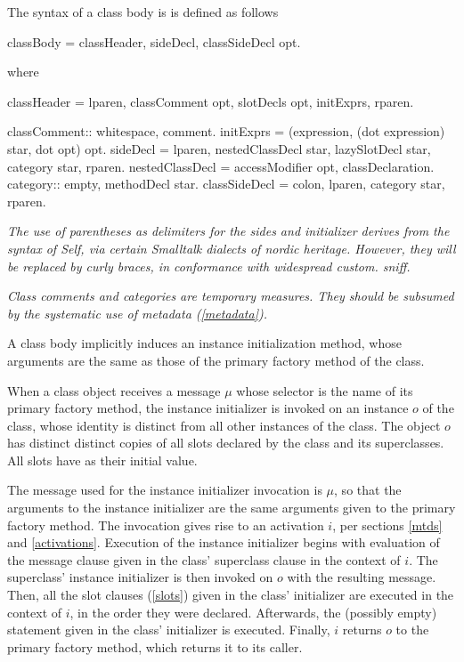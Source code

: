 \documentclass{article}
\begin{document}
The syntax of a class body is is defined as follows


\begin{newspeak}
classBody = classHeader, sideDecl, classSideDecl opt.
\end{newspeak}
where

\begin{newspeak}
classHeader =  lparen,  classComment opt, 
                        slotDecls opt, initExprs,  rparen.   

                                             
classComment:: whitespace, comment.     
initExprs = (expression, (dot expression) star, dot opt) opt.  
sideDecl = lparen, nestedClassDecl star, lazySlotDecl star, category star, rparen.
nestedClassDecl = accessModifier opt, classDeclaration.
category:: empty, methodDecl star.
classSideDecl = colon, lparen, category star, rparen.                               
\end{newspeak}
 
 {\it
 The use of parentheses as delimiters for the sides and initializer derives from the syntax of Self, via certain Smalltalk dialects of nordic heritage. However, they will be replaced by curly braces, in conformance with widespread custom. sniff.
 }
 
{\it
 Class comments and categories are temporary measures. They should be subsumed by the systematic use of metadata (\ref{metadata}).
 }
 
A class body implicitly induces an instance initialization method, whose arguments are the same as those of the primary factory method of the class.
 
When a class object receives a message $\mu$ whose selector is the name of its primary factory method, the instance initializer is invoked on an instance $o$ of the class, whose identity is distinct from all other instances of the class. The object $o$ has distinct distinct copies of all slots declared by the class and its superclasses. All slots have \NIL{} as their initial value. 

The message used for the instance initializer invocation is $\mu$, so that the arguments to the instance initializer are the same arguments given to the primary factory method.  The invocation gives rise to an activation $i$, per sections \ref{mtds} and \ref{activations}.
Execution of the instance initializer begins with evaluation of the message clause given in the class' superclass clause in the context of $i$. The superclass' instance initializer is then invoked on $o$ with the resulting message.
Then, all the slot clauses (\ref{slots}) given in the class' initializer are executed in the context of $i$, in the order they were declared. Afterwards, the (possibly empty) statement given in the class' initializer is executed.
Finally, $i$ returns $o$ to the primary factory method, which returns it to its caller.
 
\end{document}
